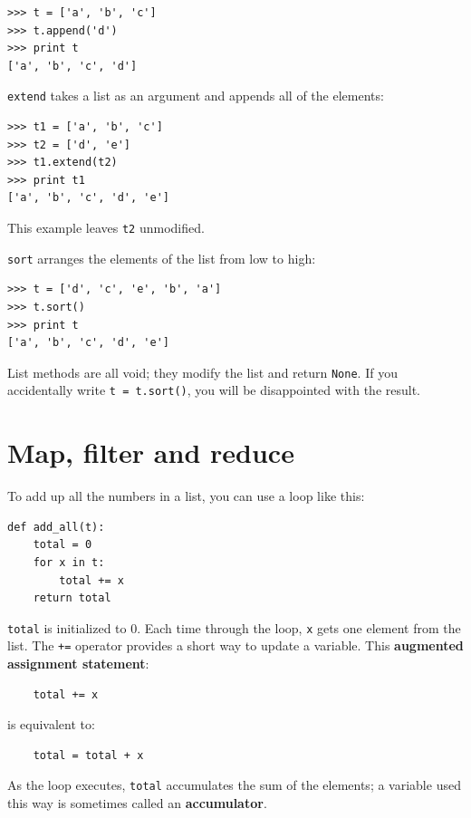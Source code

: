 \documentclass[10pt]{book}
\begin{document}
\begin{CJK}{UTF8}{gbsn}
\begin{verbatim}
>>> t = ['a', 'b', 'c']
>>> t.append('d')
>>> print t
['a', 'b', 'c', 'd']
\end{verbatim}
%
{\tt extend} takes a list as an argument and appends all of
the elements:

\begin{verbatim}
>>> t1 = ['a', 'b', 'c']
>>> t2 = ['d', 'e']
>>> t1.extend(t2)
>>> print t1
['a', 'b', 'c', 'd', 'e']
\end{verbatim}
%
This example leaves {\tt t2} unmodified.

{\tt sort} arranges the elements of the list from low to high:

\begin{verbatim}
>>> t = ['d', 'c', 'e', 'b', 'a']
>>> t.sort()
>>> print t
['a', 'b', 'c', 'd', 'e']
\end{verbatim}
%
List methods are all void; they modify the list and return {\tt None}.
If you accidentally write {\tt t = t.sort()}, you will be disappointed
with the result.


\section{Map, filter and reduce}

To add up all the numbers in a list, you can use a loop like this:


\begin{verbatim}
def add_all(t):
    total = 0
    for x in t:
        total += x
    return total
\end{verbatim}
%
{\tt total} is initialized to 0.  Each time through the loop,
{\tt x} gets one element from the list.  The {\tt +=} operator
provides a short way to update a variable.  This 
{\bf augmented assignment statement}:

\begin{verbatim}
    total += x
\end{verbatim}
%
is equivalent to:

\begin{verbatim}
    total = total + x
\end{verbatim}
%
As the loop executes, {\tt total} accumulates the sum of the
elements; a variable used this way is sometimes called an
{\bf accumulator}.


\end{CJK}
\end{document}
